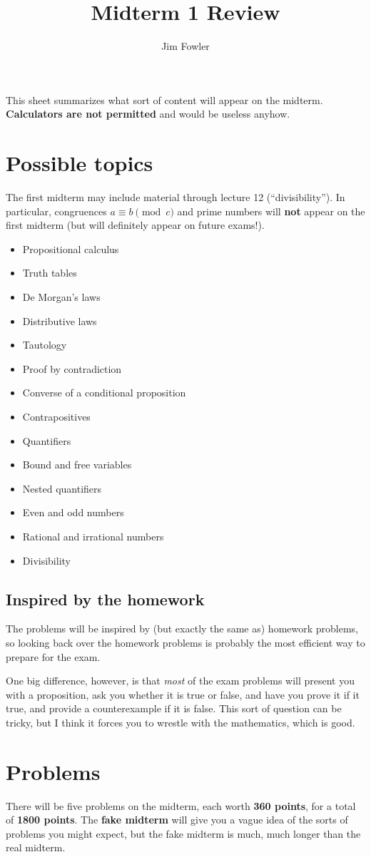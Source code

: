 \documentclass[12pt]{handout}
\title{Midterm 1 Review}
\author{Jim Fowler}
\begin{document}
\maketitle

\noindent This sheet summarizes what sort of content will appear on
the midterm.  \textbf{Calculators are not permitted} and would be
useless anyhow.

\section*{Possible topics}

The first midterm may include material through lecture 12
(``divisibility'').  In particular, congruences $a \equiv b \pmod c$
and prime numbers will \textbf{not} appear on the first midterm (but
will definitely appear on future exams!).

\begin{multicols}{2}
\begin{itemize}
\item Propositional calculus
\item Truth tables
\item De Morgan's laws
\item Distributive laws
\item Tautology
\item Proof by contradiction
\item Converse of a conditional proposition
\item Contrapositives
\item Quantifiers
\item Bound and free variables
\item Nested quantifiers
\item Even and odd numbers
\item Rational and irrational numbers
\item Divisibility
\end{itemize}
\end{multicols}

\subsection*{Inspired by the homework}

The problems will be inspired by (but exactly the same as) homework
problems, so looking back over the homework problems is probably the
most efficient way to prepare for the exam.

One big difference, however, is that \textit{most} of the exam
problems will present you with a proposition, ask you whether it is
true or false, and have you prove it if it true, and provide a
counterexample if it is false.  This sort of question can be tricky,
but I think it forces you to wrestle with the mathematics, which is
good.

\section*{Problems}

There will be five problems on the midterm, each worth \textbf{360
  points}, for a total of \textbf{1800 points}.  The \textbf{fake
  midterm} will give you a vague idea of the sorts of problems you
might expect, but the fake midterm is much, much longer than the real
midterm.
\end{document}
